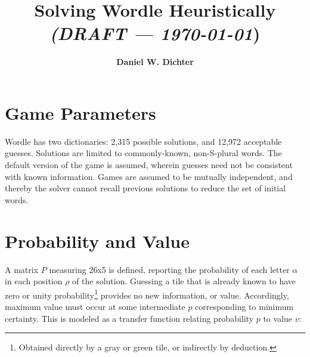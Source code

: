 \documentclass[twocolumn]{tudelft-aiaa}
\title{Solving Wordle Heuristically \normalsize \color{red} \emph{(DRAFT --- \today}) \color{black}}
\author{\textbf{Daniel W. Dichter}}
\affil{Independent Researcher\\Cambridge, Massachusetts, U.S.A.\\daniel.w.dichter@gmail.com}
\begin{document}


\section{Game Parameters}

Wordle has two dictionaries: 2,315 possible solutions, and 12,972 acceptable guesses.\cite{Wardle}\cite{Glaiel} Solutions are limited to commonly-known, non-S-plural words. The default version of the game is assumed, wherein guesses need not be consistent with known information. Games are assumed to be mutually independent, and thereby the solver cannot recall previous solutions to reduce the set of initial words.

\section{Probability and Value}

A matrix $P$ measuring 26x5 is defined, reporting the probability of each letter $\alpha$ in each position $\rho$ of the solution. Guessing a tile that is already known to have zero or unity probability\footnote{Obtained directly by a gray or green tile, or indirectly by deduction.} provides no new information, or value. Accordingly, maximum value must occur at some intermediate $p$ corresponding to minimum certainty. This is modeled as a transfer function relating probability $p$ to value $v$:
\end{document}
